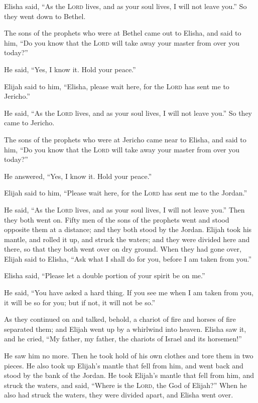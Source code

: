 Elisha said, ``As the \textsc{Lord} lives, and as your soul lives, I
will not leave you.'' So they went down to Bethel.

 The sons of the prophets who were at Bethel came out to
Elisha, and said to him, ``Do you know that the \textsc{Lord} will take
away your master from over you today?''

He said, ``Yes, I know it. Hold your peace.''

 Elijah said to him, ``Elisha, please wait here, for the
\textsc{Lord} has sent me to Jericho.''

He said, ``As the \textsc{Lord} lives, and as your soul lives, I will
not leave you.'' So they came to Jericho.

 The sons of the prophets who were at Jericho came near to
Elisha, and said to him, ``Do you know that the \textsc{Lord} will take
away your master from over you today?''

He answered, ``Yes, I know it. Hold your peace.''

 Elijah said to him, ``Please wait here, for the
\textsc{Lord} has sent me to the Jordan.''

He said, ``As the \textsc{Lord} lives, and as your soul lives, I will
not leave you.'' Then they both went on.  Fifty men of the
sons of the prophets went and stood opposite them at a distance; and
they both stood by the Jordan.  Elijah took his mantle,
and rolled it up, and struck the waters; and they were divided here and
there, so that they both went over on dry ground.  When
they had gone over, Elijah said to Elisha, ``Ask what I shall do for
you, before I am taken from you.''

Elisha said, ``Please let a double portion of your spirit be on me.''

 He said, ``You have asked a hard thing. If you see me
when I am taken from you, it will be so for you; but if not, it will not
be so.''

 As they continued on and talked, behold, a chariot of
fire and horses of fire separated them; and Elijah went up by a
whirlwind into heaven.  Elisha saw it, and he cried, ``My
father, my father, the chariots of Israel and its horsemen!''

He saw him no more. Then he took hold of his own clothes and tore them
in two pieces.  He also took up Elijah's mantle that fell
from him, and went back and stood by the bank of the Jordan.
 He took Elijah's mantle that fell from him, and struck
the waters, and said, ``Where is the \textsc{Lord}, the God of Elijah?''
When he also had struck the waters, they were divided apart, and Elisha
went over.


